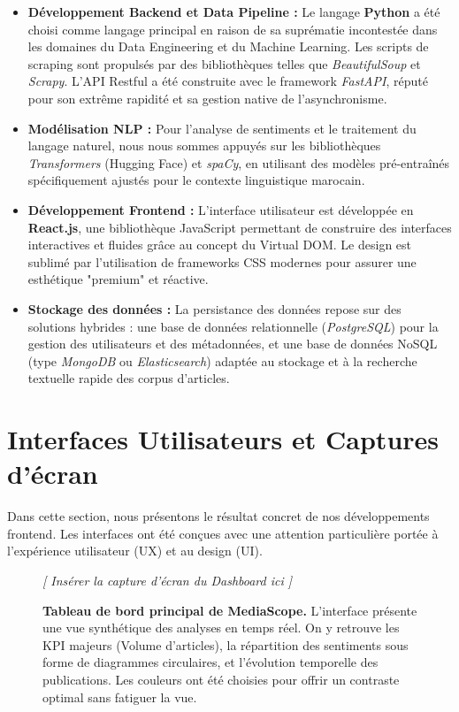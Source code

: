 \documentclass[12pt,a4paper,oneside]{report}
\begin{document}
\begin{itemize}[label=\textcolor{secondary}{\textbullet}, itemsep=10pt]
    \item \textbf{Développement Backend et Data Pipeline :} Le langage \textbf{Python} a été choisi comme langage principal en raison de sa suprématie incontestée dans les domaines du Data Engineering et du Machine Learning. Les scripts de scraping sont propulsés par des bibliothèques telles que \textit{BeautifulSoup} et \textit{Scrapy}. L'API Restful a été construite avec le framework \textit{FastAPI}, réputé pour son extrême rapidité et sa gestion native de l'asynchronisme.
    \item \textbf{Modélisation NLP :} Pour l'analyse de sentiments et le traitement du langage naturel, nous nous sommes appuyés sur les bibliothèques \textit{Transformers} (Hugging Face) et \textit{spaCy}, en utilisant des modèles pré-entraînés spécifiquement ajustés pour le contexte linguistique marocain.
    \item \textbf{Développement Frontend :} L'interface utilisateur est développée en \textbf{React.js}, une bibliothèque JavaScript permettant de construire des interfaces interactives et fluides grâce au concept du Virtual DOM. Le design est sublimé par l'utilisation de frameworks CSS modernes pour assurer une esthétique "premium" et réactive.
    \item \textbf{Stockage des données :} La persistance des données repose sur des solutions hybrides : une base de données relationnelle (\textit{PostgreSQL}) pour la gestion des utilisateurs et des métadonnées, et une base de données NoSQL (type \textit{MongoDB} ou \textit{Elasticsearch}) adaptée au stockage et à la recherche textuelle rapide des corpus d'articles.
\end{itemize}

\section{Interfaces Utilisateurs et Captures d'écran}
Dans cette section, nous présentons le résultat concret de nos développements frontend. Les interfaces ont été conçues avec une attention particulière portée à l'expérience utilisateur (UX) et au design (UI).

\begin{figure}[H]
    \centering
    \begin{figbox}
        \vspace{7cm}
        \textcolor{textgray}{\Large \textit{[ Insérer la capture d'écran du Dashboard ici ]}}
        \vspace{7cm}
    \end{figbox}
    \caption{\textbf{Tableau de bord principal de MediaScope.} L'interface présente une vue synthétique des analyses en temps réel. On y retrouve les KPI majeurs (Volume d'articles), la répartition des sentiments sous forme de diagrammes circulaires, et l'évolution temporelle des publications. Les couleurs ont été choisies pour offrir un contraste optimal sans fatiguer la vue.}
    \label{fig:dashboard}
\end{figure}
\end{document}
